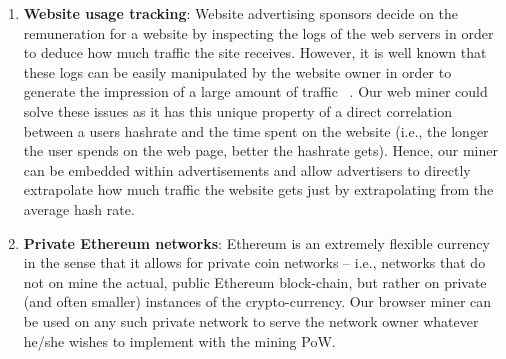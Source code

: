 \documentclass[10pt, conference, compsocconf]{IEEEtran}
\begin{document}
\begin{enumerate}
\item \textbf{Website usage tracking}: Website advertising sponsors decide on the remuneration for a website by inspecting the logs of the web servers in order to deduce how much traffic the site receives. However, it is well known that these logs can be easily manipulated by the website owner in order to generate the impression of a large amount of traffic ~\cite{webLogsManipulation}. Our web miner could solve these issues as it has this unique property of a direct correlation between a users hashrate and the time spent on the website (i.e., the longer the user spends on the web page, better the hashrate gets). Hence, our miner can be embedded within advertisements and allow advertisers to directly extrapolate how much traffic the website gets just by extrapolating from the average hash rate.
\item \textbf{Private Ethereum networks}: Ethereum is an extremely flexible currency in the sense that it allows for private coin networks -- i.e., networks that do not on mine the actual, public Ethereum block-chain, but rather on private (and often smaller) instances of the crypto-currency. Our browser miner can be used on any such private network to serve the network owner whatever he/she wishes to implement with the mining PoW.
\end{enumerate}
\end{document}
